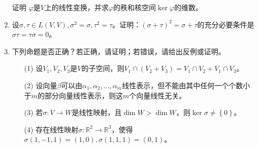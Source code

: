 \begin{enumerate}
          证明 \(\varphi\)是\(V\)上的线性变换，并求\(\varphi\)的秩和核空间\(\ker\varphi\)的维数。


    \item 设\(\sigma,\tau \in L(V,V),\sigma^2 = \sigma,\tau^2 = \tau\)。证明：\((\sigma + \tau)^2 = \sigma + \tau\)的充分必要条件是\(\sigma\tau = \tau\sigma = 0\)。

    \item 下列命题是否正确？若正确，请证明；若错误，请给出反例或证明。
          \begin{enumerate}
              \item[(1)] 设\(V_1,V_2,V_3\)是\(V\)的子空间，则\(V_1 \cap \left( V_2 + V_3 \right) = V_1 \cap V_2 + V_1 \cap V_3\)。
              \item[(2)] 设向量\(\beta\)可以由\(\alpha_1,\alpha_2,\ldots,\alpha_{m}\)线性表示，但不能由其中任何一个个数小于\(m\)的部分向量线性表示，则这\(m\)个向量线性无关。
              \item[(3)] 若\(\sigma:V \rightarrow W\)是线性映射，且\(\dim W > \dim W\)，则\(\ker\sigma \neq \left\{ 0 \right\}\)。
              \item[(4)] 存在线性映射\(\sigma:\mathbb{R}^2 \rightarrow \mathbb{R}^3\)，使得\(\sigma(1, - 1,1) = (1,0),\sigma(1,1,1) = (0,1)\)。
          \end{enumerate}
\end{enumerate}

\clearpage
